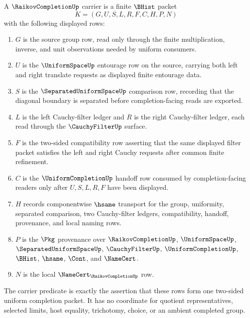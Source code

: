 \begin{definition}
\label{def:raikov-completion-carrier}
A $\RaikovCompletionUp$ carrier is a finite $\BHist$ packet
$$
K=(G,U,S,L,R,F,C,H,P,N)
$$
with the following displayed rows:
\begin{enumerate}
\item $G$ is the source group row, read only through the finite multiplication, inverse, and unit observations needed by uniform consumers.
\item $U$ is the $\UniformSpaceUp$ entourage row on the source, carrying both left and right translate requests as displayed finite entourage data.
\item $S$ is the $\SeparatedUniformSpaceUp$ comparison row, recording that the diagonal boundary is separated before completion-facing reads are exported.
\item $L$ is the left Cauchy-filter ledger and $R$ is the right Cauchy-filter ledger, each read through the $\CauchyFilterUp$ surface.
\item $F$ is the two-sided compatibility row asserting that the same displayed filter packet satisfies the left and right Cauchy requests after common finite refinement.
\item $C$ is the $\UniformCompletionUp$ handoff row consumed by completion-facing readers only after $U,S,L,R,F$ have been displayed.
\item $H$ records componentwise $\hsame$ transport for the group, uniformity, separated comparison, two Cauchy-filter ledgers, compatibility, handoff, provenance, and local naming rows.
\item $P$ is the $\Pkg$ provenance over $\RaikovCompletionUp$, $\UniformSpaceUp$, $\SeparatedUniformSpaceUp$, $\CauchyFilterUp$, $\UniformCompletionUp$, $\BHist$, $\hsame$, $\Cont$, and $\NameCert$.
\item $N$ is the local $\NameCert_{\RaikovCompletionUp}$ row.
\end{enumerate}
The carrier predicate is exactly the assertion that these rows form one two-sided uniform completion packet. It has no coordinate for quotient representatives, selected limits, host equality, trichotomy, choice, or an ambient completed group.
\end{definition}

